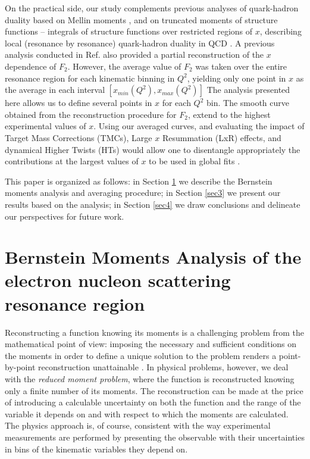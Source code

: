 \documentclass[
twocolumn,
aps,prd,
nofootinbib,
superscriptaddress,
showpacs,ligh
tightenlines, 
]{revtex4}
\begin{document}
On the practical side, our study complements previous analyses of quark-hadron duality based on Mellin moments \cite{Niculescu:2015wka,Niculescu:2000tk}, and on truncated moments of structure functions -- integrals of structure functions over restricted regions of $x$, describing local (resonance by resonance) quark-hadron duality in QCD \cite{Psaker:2008ju}. A previous analysis conducted in Ref.\cite{Bianchi:2003hi} also provided a partial reconstruction of the $x$ dependence of $F_2$. However, the average value of $F_2$ was taken over the entire resonance region for each kinematic binning in $Q^2$, yielding only one point in $x$ as the average in each interval $[x_{min}(Q^2), x_{max}(Q^2)]$ 
The analysis presented here allows us to define several points in $x$ for each $Q^2$ bin. The  smooth curve  obtained from the reconstruction procedure for $F_2$, extend to the highest experimental values of $x$. Using our averaged curves, and evaluating the impact of Target Mass Corrections (TMCs), Large $x$ Resummation (LxR) effects, and dynamical Higher Twists (HTs) would allow one to disentangle appropriately the contributions at the largest values of $x$ to be used in global fits \cite{Malace:2009kw}.

This paper is organized as follows: in Section \ref{sec2} we describe the Bernstein moments analysis and averaging procedure; in Section \ref{sec3} we present our results based on the analysis; in Section \ref{sec4} we draw conclusions and delineate our perspectives for future work. 

\section{Bernstein Moments Analysis of the electron nucleon scattering resonance region}
\label{sec2}
Reconstructing a function knowing its moments is a challenging problem from the mathematical point of view: 
imposing the necessary and sufficient conditions on the moments in order to define a unique solution to the problem renders a point-by-point reconstruction unattainable
\cite{Gaemers:1980hc}.
In physical problems, however, we deal with the {\em reduced moment problem}, where the function is reconstructed knowing only a finite number of its moments. The reconstruction can be made at the price of introducing a calculable uncertainty on both the function and the range of the variable it depends on and with respect to which the moments are calculated. 
The physics approach is, of course, consistent with the way experimental measurements are performed by presenting the observable with their uncertainties in bins of the kinematic variables they depend on.  
 
\end{document}
